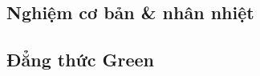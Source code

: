 \bigskip

\subsection*{Nghiệm cơ bản \& nhân nhiệt}
\begin{ctbox}\end{ctbox}

\smallskip

\begin{ctbox}\end{ctbox}

\bigskip

\subsection*{Đẳng thức Green}
\begin{ctbox}\end{ctbox}
